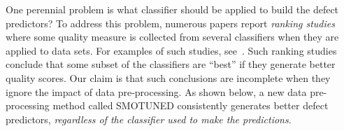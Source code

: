 \documentclass[10pt,conference]{IEEEtran}
\theoremstyle{break}
\theoremstyle{break}
\newcommand{\smb}{{\sc SMOTUNED}}
\begin{document}
One perennial problem   is what classifier should be applied to build the defect predictors?
To address this problem, numerous papers report {\em ranking studies} where
some quality measure  is collected from  several  classifiers when they are 
 applied to data sets.
For examples of such studies,
see~\cite{lessmann2008benchmarking,hall2012systematic,elish2008predicting,menzies2010defect,gondra2008applying,radjenovic2013software,jiang2008techniques,wang2013using,mende2009revisiting,li2012sample,khoshgoftaar2010attribute,jiang2009variance,ghotra2015revisiting,jiang2008can,tantithamthavorn2016automated,fu2016tuning}.
Such ranking studies conclude that some subset of the classifiers
are  ``best'' if they generate  better quality scores.
Our claim is that such conclusions are incomplete when
they ignore the impact of  
data pre-processing. As shown below,
a new data pre-processing method called {\smb}
 consistently generates better 
defect predictors,
{\em regardless of the classifier used
to make the predictions}.  
\end{document}

